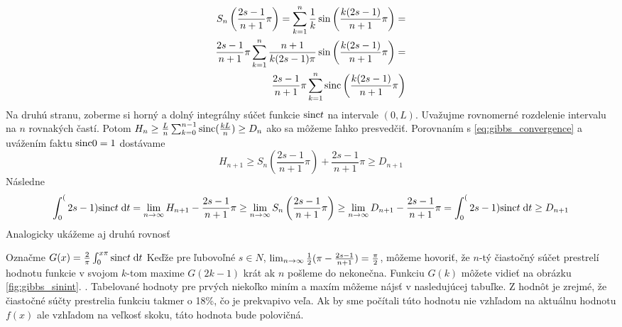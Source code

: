 \begin{dokaz}
    \begin{align}
        S_n\left(\frac{2s-1}{n+1}\pi\right) =
            \sum_{k=1}^n \frac{1}{k}
            \sin\left(\frac{k(2s-1)}{n+1}\pi\right) = \\
         \frac{2s-1}{n+1}\pi    
            \sum_{k=1}^n \frac{n+1}{k(2s-1)\pi}
            \sin\left(\frac{k(2s-1)}{n+1}\pi\right) = \\
         \frac{2s-1}{n+1}\pi    
            \sum_{k=1}^n {\rm sinc}\left( \frac{k(2s-1)}{n+1} \pi \right)            
        \label{eq:gibbs_convergence}
    \end{align}
    Na druhú stranu, zoberme si  horný a dolný
    integrálny súčet funkcie ${\rm sinc} t$ na intervale $(0,L)$.
    Uvažujme rovnomerné rozdelenie intervalu na $n$ rovnakých častí.
    Potom $H_n \ge \frac{L}{n} \sum_{k=0}^{n-1} {\rm sinc}(\frac{k L}{n}) \ge D_n$
    ako sa môžeme ľahko presvedčiť.
    Porovnaním s \ref{eq:gibbs_convergence} a uvážením faktu
    ${\rm sinc} 0 =1$ dostávame
    \begin{equation}
        H_{n+1} \ge S_n\left(\frac{2s-1}{n+1}\pi\right) +
        \frac{2s-1}{n+1}\pi \ge D_{n+1}
    \end{equation}
    Následne
    \begin{equation}
       \int_0^(2s-1) {\rm sinc} t \; \mathrm{d} t = 
       \lim_{n \rightarrow \infty} H_{n+1} - \frac{2s-1}{n+1}\pi \ge 
       \lim_{n \rightarrow \infty} S_n\left(\frac{2s-1}{n+1}\pi\right) \ge
       \lim_{n \rightarrow \infty} D_{n+1} - \frac{2s-1}{n+1}\pi =
       \int_0^(2s-1) {\rm sinc} t \; \mathrm{d} t                     
        \ge D_{n+1}
    \end{equation}
    Analogicky ukážeme aj druhú rovnosť    
\end{dokaz}

Označme $G(x) = \frac{2}{\pi} \int_0^{x \pi} {\rm sinc} t \; \mathrm{d} t$ 
Keďže pre ľubovoľné $s\in N$, $\lim_{n \rightarrow \infty} \frac{1}{2} (\pi -
\frac{2s-1}{n+1} )=\frac{\pi}{2}$, môžeme hovoriť, že
$n$-tý čiastočný súčet prestrelí hodnotu funkcie
v svojom $k$-tom maxime $G(2k-1)$ krát ak
$n$ pošleme do nekonečna.
Funkciu $G(k)$ môžete vidieť na obrázku \ref{fig:gibbs_sinint}.
.
Tabelované hodnoty pre prvých niekoľko miním a maxím môžeme nájsť v
nasledujúcej tabuľke. 
Z hodnôt je zrejmé, že čiastočné súčty prestrelia funkciu takmer o
18\%, čo je prekvapivo veľa. Ak by sme počítali túto hodnotu nie
vzhľadom na aktuálnu hodnotu $f(x)$ ale vzhľadom na veľkosť skoku,
táto hodnota bude polovičná. 
\begin{lema}
    
\end{lema}

    
